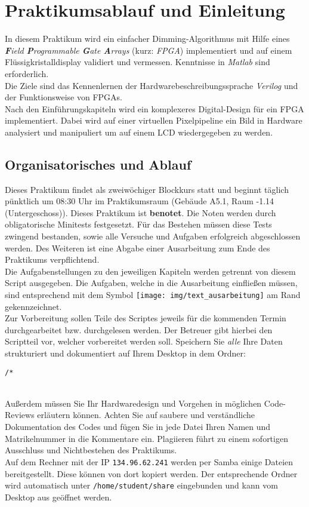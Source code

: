 \section{Praktikumsablauf und Einleitung}
\label{sec:einleitung}
In diesem Praktikum wird ein einfacher Dimming-Algorithmus mit Hilfe eines \emph{\textbf{F}ield \textbf{P}rogrammable \textbf{G}ate \textbf{A}rrays} (kurz: \emph{FPGA}) implementiert und auf einem Flüssigkristalldisplay validiert und vermessen. Kenntnisse in \emph{Matlab} sind erforderlich.\\
Die Ziele sind das Kennenlernen der Hardwarebeschreibungssprache \emph{Verilog} und der Funktionsweise von FPGAs.\\
Nach den Einführungskapiteln wird ein komplexeres Digital-Design für ein FPGA implementiert. Dabei wird auf einer virtuellen Pixelpipeline ein Bild in Hardware analysiert und manipuliert um auf einem LCD wiedergegeben zu werden.

\subsection*{Organisatorisches und Ablauf}
Dieses Praktikum findet als zweiwöchiger Blockkurs statt und beginnt täglich pünktlich um 08:30 Uhr im Praktikumsraum (Gebäude A5.1, Raum -1.14 (Untergeschoss)).
Dieses Praktikum ist \mbox{\textbf{benotet}}. Die Noten werden durch obligatorische Minitests festgesetzt. Für das Bestehen müssen diese Tests zwingend bestanden, sowie alle Versuche und Aufgaben erfolgreich abgeschlossen werden. Des Weiteren ist eine Abgabe einer Ausarbeitung zum Ende des Praktikums verpflichtend.\\
Die Aufgabenstellungen zu den jeweiligen Kapiteln werden getrennt von diesem Script ausgegeben.
Die Aufgaben, welche in die Ausarbeitung einfließen müssen, sind entsprechend mit dem Symbol \texttt{[image: img/text\_ausarbeitung]} am Rand gekennzeichnet.\\
Zur Vorbereitung sollen Teile des Scriptes jeweils für die kommenden Termin durchgearbeitet bzw. durchgelesen werden. Der Betreuer gibt hierbei den Scriptteil vor, welcher vorbereitet werden soll. Speichern Sie \emph{alle} Ihre Daten strukturiert und dokumentiert auf Ihrem Desktop in dem Ordner:\\
\centerline{\texttt{\verzeichnisDesktop/*}}\\
Außerdem müssen Sie Ihr Hardwaredesign und Vorgehen in möglichen Code-Reviews erläutern können. Achten Sie auf saubere und verständliche Dokumentation des Codes und fügen Sie in jede Datei Ihren Namen und Matrikelnummer in die Kommentare ein. Plagiieren führt zu einem sofortigen Ausschluss und Nichtbestehen des Praktikums. \\
Auf dem Rechner mit der IP \texttt{134.96.62.241} werden per Samba einige Dateien bereitgestellt. Diese können von dort kopiert werden. Der entsprechende Ordner wird automatisch unter \texttt{/home/student/share} eingebunden und kann vom Desktop aus geöffnet werden.
\newpage
